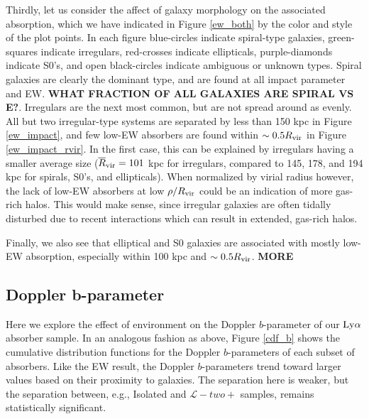 \documentclass[twocolumn,tighten]{aastex62}
\begin{document}
Thirdly, let us consider the affect of galaxy morphology on the associated absorption, which we have indicated in Figure \ref{ew_both} by the color and style of the plot points. In each figure blue-circles indicate spiral-type galaxies, green-squares indicate irregulars, red-crosses indicate ellipticals, purple-diamonds indicate S0's, and open black-circles indicate ambiguous or unknown types. Spiral galaxies are clearly the dominant type, and are found at all impact parameter and EW. \textbf{WHAT FRACTION OF ALL GALAXIES ARE SPIRAL VS E?}. Irregulars are the next most common, but are not spread around as evenly. All but two irregular-type systems are separated by less than 150 kpc in Figure \ref{ew_impact}, and few low-EW absorbers are found within $\sim 0.5 R_{\rm vir}$ in Figure \ref{ew_impact_rvir}. In the first case, this can be explained by irregulars having a smaller average size ($\overline{R}_{\rm vir} = 101$ kpc for irregulars, compared to 145, 178, and 194 kpc for spirals, S0's, and ellipticals). When normalized by virial radius however, the lack of low-EW absorbers at low $\rho / R_{\rm vir}$ could be an indication of more gas-rich halos. This would make sense, since irregular galaxies are often tidally disturbed due to recent interactions which can result in extended, gas-rich halos.

Finally, we also see that elliptical and S0 galaxies are associated with mostly low-EW absorption, especially within 100 kpc and $\sim 0.5 R_{\rm vir}$. \textbf{MORE}



\subsection{Doppler b-parameter}

Here we explore the effect of environment on the Doppler $b$-parameter of our $\rm Ly\alpha$ absorber sample. In an analogous fashion as above, Figure \ref{cdf_b} shows the cumulative distribution functions for the Doppler $b$-parameters of each subset of absorbers. Like the EW result, the Doppler $b$-parameters trend toward larger values based on their proximity to galaxies. The separation here is weaker, but the separation between, e.g., Isolated and $\mathcal{L}-two+$ samples, remains statistically significant.
\end{document}
